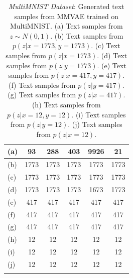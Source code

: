 \documentclass{article}
\begin{document}
\begin{table}[!h]
    \centering
    \begin{tabular}{ l | c | c | c | c | c }
        (a) & 93 & 288 & 403 & 9926 & 21 \\
        \hline
        (b) & 1773 & 1773 & 1773 & 1773 & 1773 \\
        \hline
        (c) & 1773 & 1773 & 1773 & 1773 & 1773 \\
        \hline
        (d) & 1773 & 1773 & 1773 & 1673 & 1773 \\
        \hline
        (e) & 417 & 417 & 417 & 417 & 417 \\
        \hline
        (f) & 417 & 417 & 417 & 417 & 417 \\
        \hline
        (g) & 417 & 417 & 417 & 417 & 417 \\
        \hline
        (h) & 12 & 12 & 12 & 12 & 12 \\
        \hline
        (i) & 12 & 12 & 12 & 12 & 12 \\
        \hline
        (j) & 12 & 12 & 12 & 12 & 12 \\
        \newline
    \end{tabular}
    \caption{\emph{MultiMNIST Dataset}: Generated text samples from MMVAE trained on MultiMNIST. (a) Text samples from $z \sim N(0, 1)$. (b) Text samples from $p(z|x=1773,y=1773)$. (c) Text samples from $p(z|x=1773)$. (d) Text samples from $p(z|y=1773)$. (e) Text samples from $p(z|x=417,y=417)$. (f) Text samples from $p(z|y=417)$. (g) Text samples from $p(z|x=417)$. (h) Text samples from $p(z|x=12,y=12)$. (i) Text samples from $p(z|y=12)$. (j) Text samples from $p(z|x=12)$.}
    \label{table:mnist:samples}
\end{table}
\end{document}

